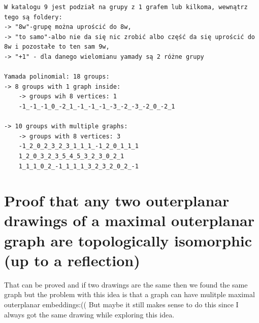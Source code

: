 \documentclass{article}
\begin{document}
\begin{verbatim}
W katalogu 9 jest podział na grupy z 1 grafem lub kilkoma, wewnątrz tego są foldery: 
-> "8w"-grupę można uprościć do 8w, 
-> "to samo"-albo nie da się nic zrobić albo część da się uprościć do 8w i pozostałe to ten sam 9w, 
-> "+1" - dla danego wielomianu yamady są 2 różne grupy

Yamada polinomial: 18 groups:
-> 8 groups with 1 graph inside:
    -> groups wih 8 vertices: 1
    -1_-1_-1_0_-2_1_-1_-1_-1_-3_-2_-3_-2_0_-2_1

-> 10 groups with multiple graphs:
    -> groups with 8 vertices: 3
    -1_2_0_2_3_2_3_1_1_1_-1_2_0_1_1_1
    1_2_0_3_2_3_5_4_5_3_2_3_0_2_1
    1_1_1_0_2_-1_1_1_1_3_2_3_2_0_2_-1
\end{verbatim}

\section {Proof that any two outerplanar drawings of a maximal outerplanar graph are topologically isomorphic (up to a reflection)} 
That can be proved and if two drawings are the same then we found the same graph but the problem with this idea is that a graph can have mulitple maximal outerplanar embeddings:(( But maybe it still makes sense to do this since I always got the same drawing while exploring this idea.
\end{document}
